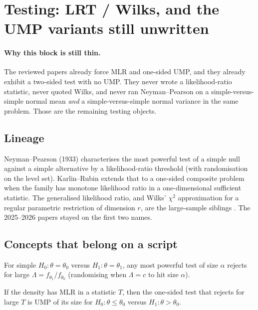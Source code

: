\section{Testing: LRT / Wilks, and the UMP variants still unwritten}
\label{sec:testing}

\paragraph{Why this block is still thin.}
The reviewed papers already force MLR and one-sided UMP, and they already exhibit a two-sided test with no UMP. They never wrote a likelihood-ratio statistic, never quoted Wilks, and never ran Neyman--Pearson on a simple-versus-simple normal mean \emph{and} a simple-versus-simple normal variance in the same problem. Those are the remaining testing objects.

\subsection{Lineage}

Neyman--Pearson (1933) characterises the most powerful test of a simple null against a simple alternative by a likelihood-ratio threshold (with randomisation on the level set). Karlin--Rubin extends that to a one-sided composite problem when the family has monotone likelihood ratio in a one-dimensional sufficient statistic. The generalised likelihood ratio, and Wilks' \(\chi^{2}\) approximation for a regular parametric restriction of dimension \(r\), are the large-sample siblings \cite{casella02}. The 2025--2026 papers stayed on the first two names.

\subsection{Concepts that belong on a script}

\begin{theorem}
\label{thm:np}
For simple \(H_{0}:\theta=\theta_{0}\) versus \(H_{1}:\theta=\theta_{1}\), any most powerful test of size \(\alpha\) rejects for large \(\Lambda=f_{\theta_{1}}/f_{\theta_{0}}\) (randomising when \(\Lambda=c\) to hit size \(\alpha\)).
\end{theorem}

\begin{theorem}
\label{thm:kr}
If the density has MLR in a statistic \(T\), then the one-sided test that rejects for large \(T\) is UMP of its size for \(H_{0}:\theta\le\theta_{0}\) versus \(H_{1}:\theta>\theta_{0}\).
\end{theorem}

